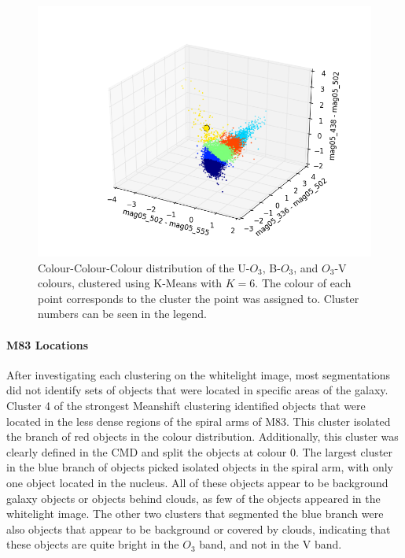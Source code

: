 \begin{figure}
\centering
\includegraphics[width=\linewidth]{figs/kmeans_3d_color_6cl_mag05_502-mag05_555vsmag05_336-mag05_502vsmag05_438-mag05_502}
\caption{Colour-Colour-Colour distribution of the U-$O_{3}$, B-$O_{3}$, and $O_{3}$-V colours, clustered using K-Means with $K=6$. The colour of each point corresponds to the cluster the point was assigned to. Cluster numbers can be seen in the legend.}
\label{fig:fig:OIIIVKM3d}
\end{figure}

\paragraph{M83 Locations}
After investigating each clustering on the whitelight image, most segmentations did not identify sets of objects that were located in specific areas of the galaxy.
Cluster 4 of the strongest Meanshift clustering identified objects that were located in the less dense regions of the spiral arms of M83.
This cluster isolated the branch of red objects in the colour distribution. Additionally, this cluster was clearly defined in the CMD and split the objects at colour 0.
The largest cluster in the blue branch of objects picked isolated objects in the spiral arm, with only one object located in the nucleus.
All of these objects appear to be background galaxy objects or objects behind clouds, as few of the objects appeared in the whitelight image.
The other two clusters that segmented the blue branch were also objects that appear to be background or covered by clouds, indicating that these objects are quite bright in the $O_{3}$ band, and not in the V band.


